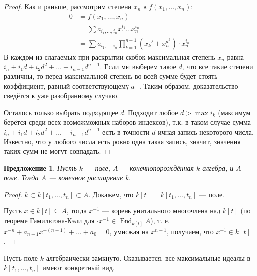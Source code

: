 \documentclass{article}
\newtheorem*{proposition}{Предложение}
\theoremstyle{definition}
\theoremstyle{remark}
\DeclareMathOperator{\End}{End}
\begin{document}
\begin{proof}
    Как и раньше, рассмотрим степени $x_n$ в $f(x_1, \hdots, x_n)$:
    \begin{align*}
        0 &= f(x_1, \hdots, x_n) \\
        &= \sum a_{i_1, \hdots, i_n} x_1^{i_1} \hdots x_n^{i_n} \\
        &= \sum a_{i_1, \hdots, i_n} \prod_{k = 1}^{n - 1} \left( x_k' + x_n^{d^k} \right) \cdot x_n^{i_n}
    \end{align*}
    В каждом из слагаемых при раскрытии скобок максимальная степень $x_n$ равна $i_n + i_1 d + i_2 d^2 + \hdots + i_{n-1} d^{n-1}$. Если мы выберем такое $d$, что все такие степени различны, то перед максимальной степень во всей сумме будет стоять коэффициент, равный соответствующему $a_{\hdots}$. Таким образом, доказательство сведётся к уже разобранному случаю.

    Осталось только выбрать подходящее $d$. Подходит любое $d > \max i_k$ (максимум берётся среди всех возможможных наборов индексов), т.к. в таком случае сумма $i_n + i_1 d + i_2 d^2 + \hdots + i_{n-1} d^{n-1}$ есть в точности $d$-ичная запись некоторого числа. Известно, что у любого числа есть ровно одна такая запись, значит, значения таких сумм не могут совпадать.
\end{proof}

\begin{proposition}
    Пусть $k$ --- поле, $A$ --- конечнопорождённая $k$-алгебра, и $A$ --- поле. Тогда $A$ --- конечное расширение $k$.
\end{proposition}
\begin{proof}
    $k \subset k[t_1, \hdots, t_n] \subset A$. Докажем, что $k[t] = k[t_1, \hdots, t_n]$ --- поле.
    
    Пусть $x \in k[t] \subseteq A$, тогда $x^{-1}$ --- корень унитального многочлена над $k[t]$ (по теореме Гамильтона-Кэли для $\cdot x^{-1} \in \End_{k[t]}A$), т. е. $x^{-n} + a_{n - 1}x^{-(n - 1)} + \ldots + a_0 = 0$, умножая на $x^{n - 1}$, получаем, что $x^{-1} \in k[t]$.
\end{proof}

Пусть поле $k$ алгебраически замкнуто. Оказывается, все максимальные идеалы в $k[t_1, \hdots, t_n]$ имеют конкретный вид.
\end{document}
